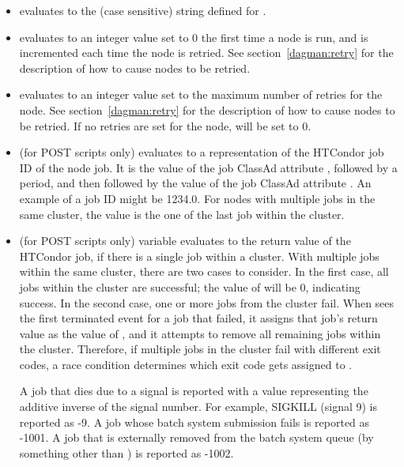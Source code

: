 \begin{itemize}
\item {}
 evaluates to the (case sensitive) string
defined for .

\item {}
 evaluates to an 
integer value set to 0 the first time a node is run,
and is incremented each time the node is retried. 
See section~\ref{dagman:retry} for the description of how to cause
nodes to be retried. 

\item {}
 evaluates to an integer value set 
to the maximum number of retries for the node.
See section~\ref{dagman:retry} for the description of how to cause
nodes to be retried.  
If no retries are set for the node,
 will be set to 0.

\item {}
 (for POST scripts only)
evaluates to a representation of the HTCondor job ID of the node job.
It is the value of the job ClassAd attribute ,
followed by a period,
and then followed by the value of the job ClassAd attribute .
An example of a job ID might be 1234.0.
For nodes with multiple jobs in the same cluster,
the  value is the one of the last job within the cluster.

\item {}
 (for POST scripts only) variable evaluates to
the return value of the 
HTCondor job, if there is a single job within a cluster.
With multiple jobs within the same cluster,
there are two cases to consider.
In the first case, all jobs within the cluster are successful;
the value of  will be 0, indicating success.
In the second case,
one or more jobs from the cluster fail.
When  sees the first terminated event for a job that failed,
it assigns that job's return value as the value of ,
and it attempts to remove all remaining jobs within the cluster.
Therefore, if multiple jobs in the cluster fail with different exit codes,
a race condition determines which exit code gets assigned to .

A job that dies due to a signal is reported with a  value
representing the additive inverse of the signal number.
For example, SIGKILL (signal 9) is reported as -9.
A job whose batch system submission fails is reported as -1001.
A job that is externally removed from the batch system queue
(by something other than ) is reported as -1002.


\end{itemize}
